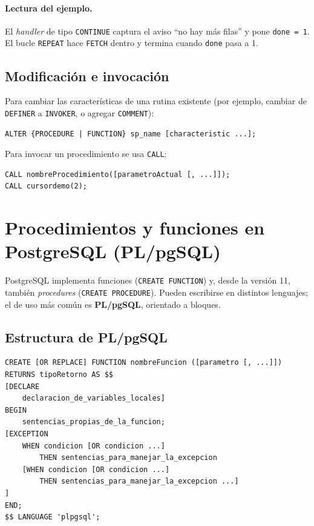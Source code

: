 \documentclass[11pt,a4paper]{article}
\begin{document}
\paragraph{Lectura del ejemplo.} El \emph{handler} de tipo
\texttt{CONTINUE} captura el aviso ``no hay más filas'' y pone
\texttt{done = 1}. El bucle \texttt{REPEAT} hace \texttt{FETCH}
dentro y termina cuando \texttt{done} pasa a 1.

\subsection{Modificación e invocación}

Para cambiar las características de una rutina existente (por ejemplo,
cambiar de \texttt{DEFINER} a \texttt{INVOKER}, o agregar
\texttt{COMMENT}):

\begin{lstlisting}
ALTER {PROCEDURE | FUNCTION} sp_name [characteristic ...];
\end{lstlisting}

Para invocar un procedimiento se usa \texttt{CALL}:

\begin{lstlisting}
CALL nombreProcedimiento([parametroActual [, ...]]);
CALL cursordemo(2);
\end{lstlisting}

\section{Procedimientos y funciones en PostgreSQL (PL/pgSQL)}

PostgreSQL implementa funciones (\texttt{CREATE FUNCTION}) y, desde la
versión 11, también \emph{procedures} (\texttt{CREATE PROCEDURE}).
Pueden escribirse en distintos lenguajes; el de uso más común es
\textbf{PL/pgSQL}, orientado a bloques.

\subsection{Estructura de PL/pgSQL}

\begin{lstlisting}
CREATE [OR REPLACE] FUNCTION nombreFuncion ([parametro [, ...]])
RETURNS tipoRetorno AS $$
[DECLARE
    declaracion_de_variables_locales]
BEGIN
    sentencias_propias_de_la_funcion;
[EXCEPTION
    WHEN condicion [OR condicion ...]
        THEN sentencias_para_manejar_la_excepcion
    [WHEN condicion [OR condicion ...]
        THEN sentencias_para_manejar_la_excepcion ...]
]
END;
$$ LANGUAGE 'plpgsql';
\end{lstlisting}
\end{document}
